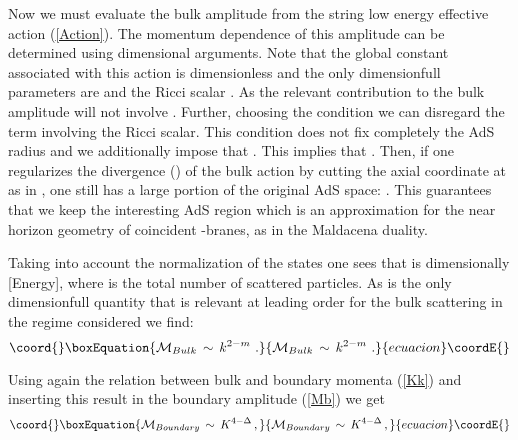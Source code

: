 \documentclass[a4paper,twocolumn,prd,groupedaddress,nofootinbib]{revtex4}
\begin{document}
Now we must evaluate the bulk amplitude from the string low energy 
effective action (\ref{Action}). 
The momentum dependence of this amplitude can be determined using dimensional arguments.
Note that the global constant 
\coordHE{} associated with this action is dimensionless
and the only dimensionfull parameters are \coordHE{} and the 
Ricci scalar \coordHE{}. 
As \coordHE{} the relevant contribution to the bulk amplitude will not involve
\coordHE{}.  Further, choosing the condition  \coordHE{}
we can disregard the term involving the Ricci scalar.
This condition does not fix completely the AdS radius \coordHE{} and we additionally 
impose that \coordHE{}. This implies that \coordHE{}.
Then, if one regularizes the divergence (\coordHE{}) of the bulk action by cutting the axial
coordinate
\coordHE{} at  \coordHE{} as in \cite{GKP}, one still has a large portion of
the original AdS space: \coordHE{}.
This guarantees that we keep the interesting AdS region which is 
an approximation for the near horizon geometry of \coordHE{} coincident \coordHE{}-branes,
as in the Maldacena duality.

Taking into account the normalization of the states \coordHE{}
one sees that \coordHE{} is dimensionally [Energy]\coordHE{},  where \coordHE{} 
is the total number of scattered particles. As \coordHE{} is the only dimensionfull
quantity that is relevant at leading order for the bulk scattering in the 
regime considered we find:
\begin{equation}\coord{}\boxEquation{
{\cal M}_{Bulk}\,\sim\, k^{ 2 - m }\,\,.
}{
{\cal M}_{Bulk}\,\sim\, k^{ 2 - m }\,\,.
}{ecuacion}\coordE{}\end{equation}

\noindent Using again the relation between bulk and boundary 
momenta (\ref{Kk}) and inserting this result in the boundary amplitude (\ref{Mb})
we get
\begin{equation}\coord{}\boxEquation{
{\cal M}_{Boundary} \,\sim \,K^{4 - \Delta } \,,
}{
{\cal M}_{Boundary} \,\sim \,K^{4 - \Delta } \,,
}{ecuacion}\coordE{}\end{equation}
\end{document}
